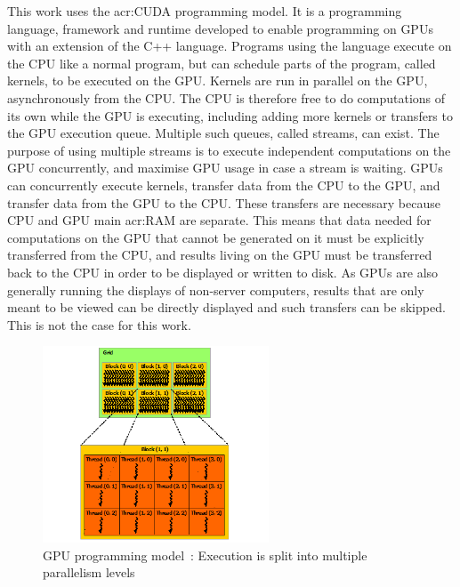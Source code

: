 This work uses the \acrshort{acr:CUDA} programming model. It is a programming language, framework
and runtime developed to enable programming on GPUs with an extension of the C++ language. Programs
using the language execute on the CPU like a normal program, but can schedule parts of the program,
called kernels, to be executed on the GPU. Kernels are run in parallel on the GPU, asynchronously
from the CPU. The CPU is therefore free to do computations of its own while the GPU is executing,
including adding more kernels or transfers to the GPU execution queue. Multiple such queues, called
streams, can exist. The purpose of using multiple streams is to execute independent computations on
the GPU concurrently, and maximise GPU usage in case a stream is waiting. GPUs can concurrently
execute kernels, transfer data from the CPU to the GPU, and transfer data from the GPU to the CPU.
These transfers are necessary because CPU and GPU main \acrlong{acr:RAM} are separate. This means
that data needed for computations on the GPU that cannot be generated on it must be explicitly
transferred from the CPU, and results living on the GPU must be transferred back to the CPU in order
to be displayed or written to disk. As GPUs are also generally running the displays of non-server
computers, results that are only meant to be viewed can be directly displayed and such transfers can
be skipped. This is not the case for this work. 

\begin{figure}[H]
	\centering
	\includegraphics[width=0.6\textwidth]{Chapter_graphics_processing_units/media/grid-of-thread-blocks}
	\caption{GPU programming model~\cite{Nvidia2021}: Execution is split into multiple parallelism levels}
	\label{fig:gpu_programming_model}
\end{figure}


